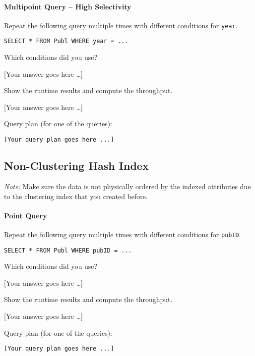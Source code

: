 \documentclass[11pt]{scrartcl}
\newcommand{\youranswerhere}{[Your answer goes here \ldots]}
\begin{document}
\paragraph{Multipoint Query -- High Selectivity}

Repeat the following query multiple times with different conditions for \texttt{year}.

\begin{lstlisting}[style=dbtsql]
SELECT * FROM Publ WHERE year = ...
\end{lstlisting}

Which conditions did you use?

\youranswerhere{}

Show the runtime results and compute the throughput.

\youranswerhere{}

Query plan (for one of the queries):

{\small
\parskip0pt\begin{verbatim}
[Your query plan goes here ...]
\end{verbatim}}

\subsection*{Non-Clustering Hash Index}

\emph{Note:} Make sure the data is not physically ordered by the indexed attributes due to the clustering index that you created before.

\paragraph{Point Query}

Repeat the following query multiple times with different conditions for \texttt{pubID}.

\begin{lstlisting}[style=dbtsql]
SELECT * FROM Publ WHERE pubID = ...
\end{lstlisting}

Which conditions did you use?

\youranswerhere{}

Show the runtime results and compute the throughput.

\youranswerhere{}

Query plan (for one of the queries):

{\small
\parskip0pt\begin{verbatim}
[Your query plan goes here ...]
\end{verbatim}}
\end{document}
